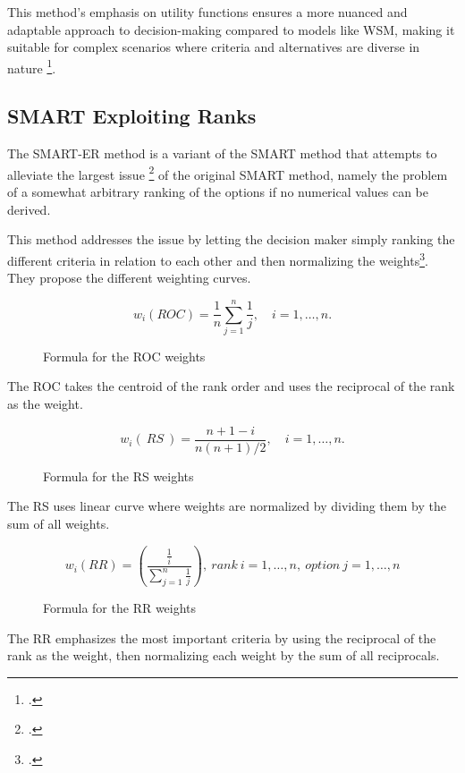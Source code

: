 This method's emphasis on utility functions ensures a more nuanced and adaptable
approach to decision-making compared to models like WSM, making it suitable for
complex scenarios where criteria and alternatives are diverse in nature \footcite[p. 6]{fulopIntroductionDecisionMaking2005}.

\subsection{SMART Exploiting Ranks}
\label{smart_er}

The \ac{SMART-ER} method is a variant of the \ac{SMART} method that attempts to alleviate the largest issue \footcitetext[p. 26]{barfodMulticriteriaDecisionAnalysis2014} of the original \ac{SMART} method, 
namely the problem of a somewhat arbitrary ranking of the options if no numerical values can be derived.

This method addresses the issue by letting the decision maker simply ranking the different criteria in relation to each other and then normalizing the weights\footcite[p. 296]{robertsWeightApproximationsMultiattribute2002a}.
They propose the different weighting curves.

\begin{figure}[h]
    \centering
    \[ w_{i}(ROC) = \frac{1}{n} \sum_{j=1}^{n} \frac{1}{j}, \quad i = 1, \ldots, n. \]
    \caption{Formula for the \ac{ROC} weights}
\end{figure}

The \ac{ROC} takes the centroid of the rank order and uses the reciprocal of the rank as the weight.

\begin{figure}[h]
    \centering
    \[ w_{i}(\ RS\ ) = \frac{n + 1 - i}{n(n + 1)/2}, \quad i = 1, \ldots, n. \]
    \caption{Formula for the \ac{RS} weights}
\end{figure}

The \ac{RS} uses linear curve where weights are normalized by dividing them by the sum of all weights.

\begin{figure}[h]
    \centering
    \[ w_i(RR) = \left( \frac{\frac{1}{i}}{\sum_{j=1}^{n} \frac{1}{j}} \right) , \ rank\ i = 1, \ldots, n, \ option\ j = 1, \ldots, n \]
    \caption{Formula for the \ac{RR} weights}
\end{figure}

The \ac{RR} emphasizes the most important criteria by using the reciprocal of the rank as the weight, then normalizing each weight by the sum of all reciprocals.